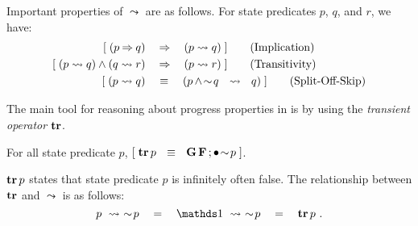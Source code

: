 Important properties of $\leadsto$ are as follows. For state
predicates $p$, $q$, and $r$, we have:
\begin{align}
  \ew{ (p \limp q) \WIDE{&\limp} (p \leadsto q)
  }\tag{Implication}\label{eq:implication} \\
  \ew{ (p \leadsto q) \land (q \leadsto r) \WIDE{&\limp} (p \leadsto r)
  }\tag{Transitivity}\label{eq:transitivity}
  \\
  \label{eq:37} 
  \ew{ (p \leadsto q)  \WIDE{&\eqv}  (p \,\land \! \spneg q \Wide{\leadsto} q)
  }\tag{Split-Off-Skip}
\end{align}

The main tool for reasoning about progress properties in \unitb is
by using the \emph{transient operator} $\tr$. 
\begin{Definition}[$\tr$ operator] For all state predicate $p$, $[\; \mathop{\textbf{tr}} p ~~\equiv~~ \mathbf{G}\, \mathbf{F} \, ;\bullet\! \sim \! p \;]$.
\end{Definition}
$\mathop{\textbf{tr}} p$ states that state predicate $p$ is infinitely often false.
The relationship between $\tr$ and $\leadsto$
is as follows:
\begin{equation}
  p \wide{\leadsto} \spneg p  \WIDE{=} \one \wide{\leadsto} \spneg p \WIDE{=}
  \tr p~.
  \label{eq:trans-prop}
\end{equation}

